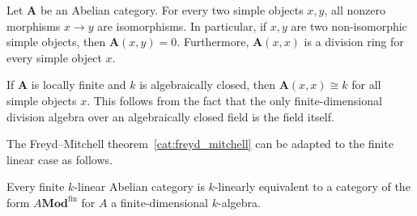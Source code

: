 
    \begin{theorem}\label{cat:schur_lemma}
        Let $\mathbf{A}$ be an Abelian category. For every two simple objects $x,y$, all nonzero morphisms $x\rightarrow y$ are isomorphisms. In particular, if $x,y$ are two non-isomorphic simple objects, then $\mathbf{A}(x,y)=0$. Furthermore, $\mathbf{A}(x,x)$ is a division ring for every simple object $x$.
    \end{theorem}
    \begin{result}
        If $\mathbf{A}$ is locally finite and $k$ is algebraically closed, then $\mathbf{A}(x,x)\cong k$ for all simple objects $x$. This follows from the fact that the only finite-dimensional division algebra over an algebraically closed field is the field itself.
    \end{result}

    The Freyd--Mitchell theorem~\ref{cat:freyd_mitchell} can be adapted to the finite linear case as follows.
    \begin{theorem}[Deligne]
        Every finite $k$-linear Abelian category is $k$-linearly equivalent to a category of the form $A\mathbf{Mod}^{\text{fin}}$ for $A$ a finite-dimensional $k$-algebra.
    \end{theorem}

